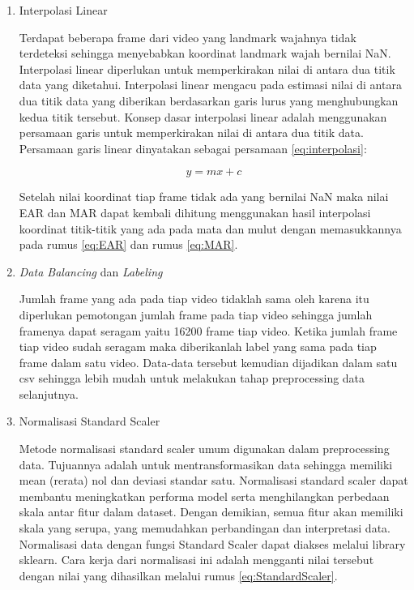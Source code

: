 \newpage
\begin{enumerate}[nolistsep]
      \item Interpolasi Linear

            Terdapat beberapa frame dari video yang landmark wajahnya
            tidak terdeteksi sehingga menyebabkan koordinat landmark wajah bernilai NaN.
            Interpolasi linear diperlukan untuk memperkirakan nilai di antara dua titik data yang diketahui.
            Interpolasi linear mengacu pada estimasi nilai di antara dua titik data yang diberikan
            berdasarkan garis lurus yang menghubungkan kedua titik tersebut. Konsep dasar interpolasi
            linear adalah menggunakan persamaan garis untuk memperkirakan nilai di antara dua titik data.
            Persamaan garis linear dinyatakan sebagai persamaan \ref{eq:interpolasi}:

            \begin{equation}
                  \label{eq:interpolasi}
                  y = mx + c
            \end{equation}

            Setelah nilai koordinat tiap frame tidak ada yang bernilai NaN maka nilai EAR dan MAR dapat kembali dihitung
            menggunakan hasil interpolasi koordinat titik-titik yang ada pada mata dan mulut dengan memasukkannya
            pada rumus \ref{eq:EAR} dan rumus \ref{eq:MAR}.

      \item \emph{Data Balancing} dan \emph{Labeling}

            Jumlah frame yang ada pada tiap video tidaklah sama oleh karena itu diperlukan pemotongan jumlah frame pada tiap video
            sehingga jumlah framenya dapat seragam yaitu 16200 frame tiap video. Ketika jumlah frame tiap video sudah seragam maka
            diberikanlah label yang sama pada tiap frame dalam satu video. Data-data tersebut kemudian dijadikan dalam satu csv
            sehingga lebih mudah untuk melakukan tahap preprocessing data selanjutnya.

      \item Normalisasi Standard Scaler

            Metode normalisasi standard scaler umum digunakan dalam preprocessing data. Tujuannya adalah untuk
            mentransformasikan data sehingga memiliki mean (rerata) nol dan deviasi standar satu. Normalisasi standard
            scaler dapat membantu meningkatkan performa model serta menghilangkan perbedaan skala antar fitur dalam dataset.
            Dengan demikian, semua fitur akan memiliki skala yang serupa, yang memudahkan perbandingan dan interpretasi data.
            Normalisasi data dengan fungsi Standard Scaler dapat diakses melalui library sklearn. Cara kerja dari normalisasi
            ini adalah mengganti nilai tersebut dengan nilai yang dihasilkan melalui rumus \ref{eq:StandardScaler}.


\end{enumerate}
